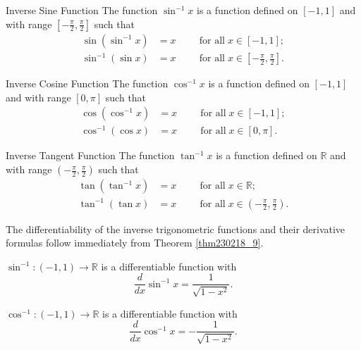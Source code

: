 \begin{definition}{Inverse Sine Function }
  The function  $\sin^{-1}x$ is a function defined on $[-1, 1]$ and with range $[-\frac{\pi}{2}, \frac{\pi}{2}]$ such that
\begin{align*}\sin(\sin^{-1}x)&=x\hspace{1cm}\text{for all}\;x\in[-1,1];\\
\sin^{-1}(\sin x)&=x\hspace{1cm}\text{for all}\; x\in\left[-\frac{\pi}{2}, \frac{\pi}{2}\right].\end{align*}
 

\end{definition}
\begin{definition}{Inverse Cosine Function }
  The function  $\cos^{-1}x$ is a function defined on $[-1, 1]$ and with range $[0, \pi]$ such that
\begin{align*}\cos(\cos^{-1}x)&=x\hspace{1cm}\text{for all}\;x\in[-1,1];\\
\cos^{-1}(\cos x)&=x\hspace{1cm}\text{for all}\; x\in [0, \pi].\end{align*}
 

\end{definition}
\begin{definition}{Inverse Tangent Function }
  The function  $\tan^{-1}x$ is a function defined on $\mathbb{R}$ and with range $(-\frac{\pi}{2}, \frac{\pi}{2})$ such that
\begin{align*}\tan(\tan^{-1}x)&=x\hspace{1cm}\text{for all}\;x\in\mathbb{R};\\
\tan^{-1}(\tan x)&=x\hspace{1cm}\text{for all}\; x\in \left(-\frac{\pi}{2}, \frac{\pi}{2}\right).\end{align*}
 

\end{definition}
The differentiability of the inverse trigonometric functions and their derivative formulas follow  immediately from Theorem \ref{thm230218_9}.

\begin{theorem}{}
$\sin^{-1}:(-1,1)\to \mathbb{R}$ is a differentiable function with
\[\frac{d}{dx}\sin^{-1}x=\frac{1}{\sqrt{1-x^2}}.\]
\end{theorem}

\begin{theorem}{}
$\cos^{-1}:(-1,1)\to \mathbb{R}$ is a differentiable function with
\[\frac{d}{dx}\cos^{-1}x=-\frac{1}{\sqrt{1-x^2}}.\]
\end{theorem}


